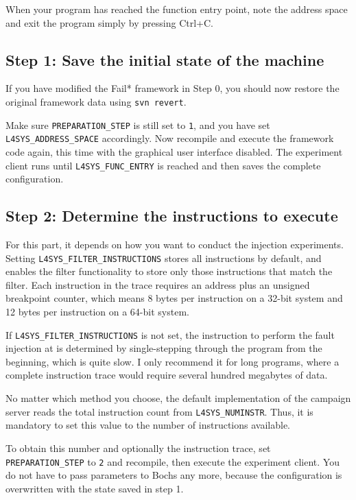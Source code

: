 \documentclass[a4paper,10pt]{article}
\begin{document}
When your program has reached the function entry point,
note the address space and exit the program simply by pressing Ctrl+C.

\subsection{Step 1: Save the initial state of the machine}

If you have modified the Fail* framework in Step 0,
you should now restore the original framework
data using \texttt{svn revert}.

Make sure \verb+PREPARATION_STEP+ is still set to \texttt{1}, and
you have set \verb+L4SYS_ADDRESS_SPACE+ accordingly.
Now recompile and execute the framework code again, this time with the graphical
user interface disabled. The experiment client runs until
\verb+L4SYS_FUNC_ENTRY+ is reached and then saves
the complete configuration.

\subsection{Step 2: Determine the instructions to execute}

For this part, it depends on how you want to conduct the injection
experiments. Setting \verb+L4SYS_FILTER_INSTRUCTIONS+
stores all instructions by default, and
enables the filter functionality to store only those
instructions that match the filter.
Each instruction in the trace requires
an address plus an unsigned breakpoint counter,
which means 8 bytes per instruction on a 32-bit system
and 12 bytes per instruction on a 64-bit system.

If \verb+L4SYS_FILTER_INSTRUCTIONS+ is not set, the instruction
to perform the fault injection at is determined by single-stepping
through the program from the beginning, which is quite slow.
I only recommend it for long programs, where a complete
instruction trace would require several hundred megabytes of data.

No matter which method you choose, the default implementation
of the campaign server reads the total instruction count
from \verb+L4SYS_NUMINSTR+. Thus, it is mandatory to set this
value to the number of instructions available.

To obtain this number and optionally the instruction trace,
set \verb+PREPARATION_STEP+ to \texttt{2} and recompile, then execute
the experiment client. You do not have to pass parameters to Bochs
any more, because the configuration is overwritten with the
state saved in step 1.
\end{document}
